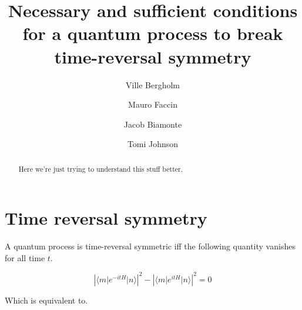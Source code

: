 \documentclass[aps,12pt,nofootinbib,superscriptaddress,longbibliography,
showpacs]{revtex4-1}
\theoremstyle{plain}
\theoremstyle{definition}
\newcommand{\bra}[1]{\mbox{$\langle #1|$}}
\newcommand{\ket}[1]{\ensuremath{|#1\rangle}}
\begin{document}

\title{Necessary and sufficient conditions for a quantum process to break
time-reversal symmetry}



\author{Ville Bergholm}

\author{Mauro Faccin}

\author{Jacob Biamonte}

\author{Tomi Johnson}






\begin{abstract}
Here we're just trying to understand this stuff better.  
\end{abstract} 


\maketitle

\section{Time reversal symmetry} 

A quantum process is time-reversal symmetric iff the following quantity
vanishes for all time $t$.  

\begin{equation}
 |\bra{m}e^{-itH}\ket{n}|^2 - |\bra{m}e^{itH}\ket{n}|^2 = 0
\end{equation}

Which is equivalent to. 
\end{document}
